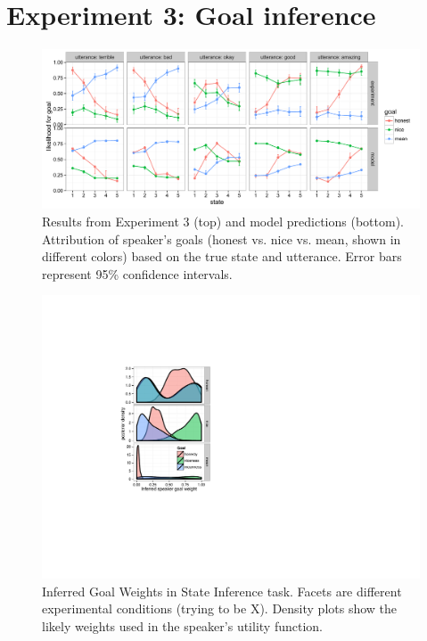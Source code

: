 \documentclass[10pt,letterpaper]{article}
\newcommand{\mcf}[1]{\textcolor{Red}{[mcf: #1]}}
\begin{document}
\section{Experiment 3: Goal inference}

\begin{figure}[!t]
\begin{center}
  \includegraphics[width=\textwidth]{figures/exp2.pdf}
  \caption{\label{fig:exp2} Results from Experiment 3 (top) and model predictions (bottom). Attribution of speaker's goals (honest vs. nice vs. mean, shown in different colors) based on the true state and utterance. Error bars represent 95\% confidence intervals.}
  \end{center}
\end{figure}


\begin{figure}[!b] %
\begin{centering}
\includegraphics[width=0.70\columnwidth]{figures/goal-posterior.pdf}
\caption{\label{fig:goal-priors-bda} Inferred Goal Weights in State Inference task.
Facets are different experimental conditions (trying to be X). Density plots show the likely weights used in the speaker's utility function.
}
\end{centering}
\end{figure}
\end{document}
